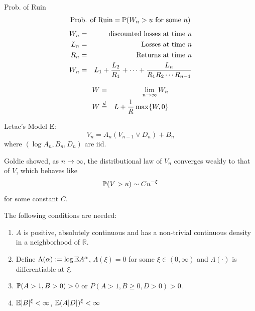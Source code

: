 \documentclass{beamer}
\begin{document}
\begin{frame}
  \begin{exampleblock}{Prob. of Ruin}
    \[
    \text{Prob. of Ruin} = \P(W_n > u \text{ for some }n)
    \]
    \begin{eqnarray*}
      W_n &=& \text{ discounted losses at time } n\\
      L_n &=& \text{ Losses at time } n \\
      R_n &=& \text{ Returns at time } n\\
      W_n &=& L_1 + {L_2 \over R_1} + \cdots +
      {L_n \over R_1 R_2 \cdots R_{n-1}}
    \end{eqnarray*}
  \end{exampleblock}
  \begin{eqnarray*}
    W &=& \lim_{n \to \infty} W_n \\
    W &\overset{d}{=}& L + {1 \over R} \max\{W, 0\}
  \end{eqnarray*}
\end{frame}

\begin{frame}
  Letac's Model E:
  \[
  V_n = A_n (V_{n-1} \vee D_n) + B_n
  \]
  where $(\log A_n, B_n, D_n)$ are iid.

Goldie showed, as $n \to \infty$, the distributional law of $V_n$ converges weakly to
that of $V$, which behaves like
\[
\P(V > u) \sim C u^{-\xi}
\]
for some constant $C$.
\end{frame}

\begin{frame}
  The following conditions are needed:
\begin{enumerate}
\item $A$ is positive, absolutely continuous and has a non-trivial continuous density in
  a neighborhood of $\mathbb R$.
\item Define $\Lambda(\alpha) := \log \E A^\alpha$, $\Lambda(\xi) = 0$ for some $\xi \in (0,
  \infty)$ and $\Lambda(\cdot)$ is differentiable at $\xi$.
\item $\P(A > 1, B > 0) > 0$ or $P(A > 1, B \geq 0, D > 0) > 0$.
\item $\E |B|^\xi < \infty$, $\E (A|D|)^\xi < \infty$
\end{enumerate}
\end{frame}
\end{document}
